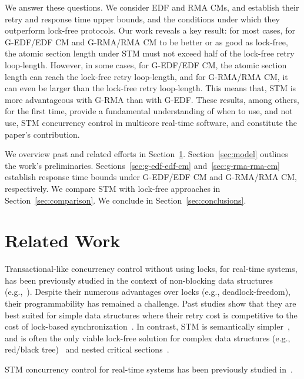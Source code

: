 \documentclass[letter]{sig-alternate}
\begin{document}
We answer these questions. We consider EDF and RMA CMs, and establish their retry and response time upper bounds, and the conditions under which they outperform lock-free protocols. Our work reveals a key result: for most cases, for G-EDF/EDF CM and G-RMA/RMA CM to be better or as good as lock-free, the atomic section length under STM must not exceed half of the lock-free retry loop-length. However, in some cases, for G-EDF/EDF CM, the atomic section length can reach the lock-free retry loop-length, and for G-RMA/RMA CM, it can even be larger than the lock-free retry loop-length.  This means that, STM is more advantageous with G-RMA than with G-EDF. These results, among others, for the first time, provide a
fundamental understanding of when to use, and not use, STM concurrency
control in multicore real-time software, and constitute the
paper's contribution. 

We overview past and related efforts in Section~\ref{sec:past}. Section~\ref{sec:model} outlines the work's preliminaries. Sections~\ref{sec:g-edf-edf-cm} and~\ref{sec:g-rma-rma-cm}
establish response time bounds under G-EDF/EDF CM and G-RMA/RMA CM, 
respectively. We compare STM with lock-free approaches in Section~\ref{sec:comparison}. We conclude in Section~\ref{sec:conclusions}.


\section{Related Work}
\label{sec:past}

Transactional-like concurrency control without using locks, for real-time systems, has been previously studied in the context of non-blocking data structures (e.g.,~\cite{anderson95realtime}). Despite their numerous advantages over locks 
(e.g., deadlock-freedom), 
their programmability has remained a challenge. 
Past studies show that they are best suited for simple data structures where their retry cost is competitive to the cost of lock-based synchronization~\cite{bc+08}.  In contrast, STM is semantically simpler~\cite{Herlihy:2006:AMP:1146381.1146382}, and is often the only viable lock-free solution for complex data structures (e.g., red/black tree)~\cite{key-1} and nested critical sections~\cite{Saha:2006:MHP:1122971.1123001}.


STM concurrency control for real-time systems has been previously studied in~\cite{manson2006preemptible,fahmy2009bounding,sarni2009real,schoeberl2010rttm,key-1,barrosmanaging}.
\end{document}
